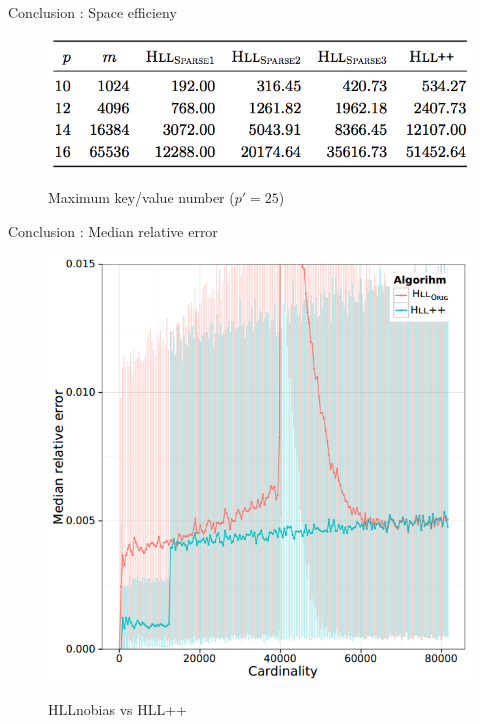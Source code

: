 \documentclass{beamer}
\begin{document}
\begin{frame}{Conclusion : Space efficieny}


\begin{figure}[c]
\includegraphics [scale=0.45]  {sparse_all.png}

Maximum key/value number ($p' = 25$)
\end{figure}

\end{frame}

\begin{frame}{Conclusion : Median relative error}

\begin{figure}[c]
\includegraphics [scale=0.30]  {hll_fig5.png}

HLLnobias vs HLL++
\end{figure}

\end{frame}
\end{document}
